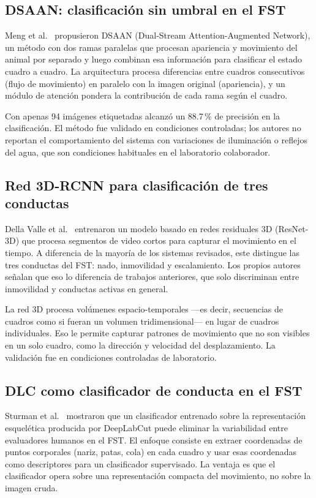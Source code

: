 \subsection{DSAAN: clasificación sin umbral en el FST}

Meng et al.\ \cite{meng2024_dsaan} propusieron DSAAN (Dual-Stream Attention-Augmented
Network), un método con dos ramas paralelas que procesan apariencia y movimiento del
animal por separado y luego combinan esa información para clasificar el estado cuadro a
cuadro. La arquitectura procesa diferencias entre cuadros consecutivos (flujo de
movimiento) en paralelo con la imagen original (apariencia), y un módulo de atención
pondera la contribución de cada rama según el cuadro.

Con apenas 94 imágenes etiquetadas alcanzó un 88.7\,\% de precisión en la clasificación.
El método fue validado en condiciones controladas; los autores no reportan el
comportamiento del sistema con variaciones de iluminación o reflejos del agua, que son
condiciones habituales en el laboratorio colaborador.

\subsection{Red 3D-RCNN para clasificación de tres conductas}

Della Valle et al.\ \cite{della_valle2025} entrenaron un modelo basado en redes
residuales 3D (ResNet-3D) que procesa segmentos de video cortos para capturar el
movimiento en el tiempo. A diferencia de la mayoría de los sistemas revisados, este
distingue las tres conductas del FST: nado, inmovilidad y escalamiento. Los propios
autores señalan que eso lo diferencia de trabajos anteriores, que solo discriminan entre
inmovilidad y conductas activas en general.

La red 3D procesa volúmenes espacio-temporales ---es decir, secuencias de cuadros como
si fueran un volumen tridimensional--- en lugar de cuadros individuales. Eso le permite
capturar patrones de movimiento que no son visibles en un solo cuadro, como la dirección
y velocidad del desplazamiento. La validación fue en condiciones controladas de
laboratorio.

\subsection{DLC como clasificador de conducta en el FST}

Sturman et al.\ \cite{sturman2020_dlc} mostraron que un clasificador entrenado sobre
la representación esquelética producida por DeepLabCut puede eliminar la variabilidad
entre evaluadores humanos en el FST. El enfoque consiste en extraer coordenadas de
puntos corporales (nariz, patas, cola) en cada cuadro y usar esas coordenadas como
descriptores para un clasificador supervisado. La ventaja es que el clasificador opera
sobre una representación compacta del movimiento, no sobre la imagen cruda.

